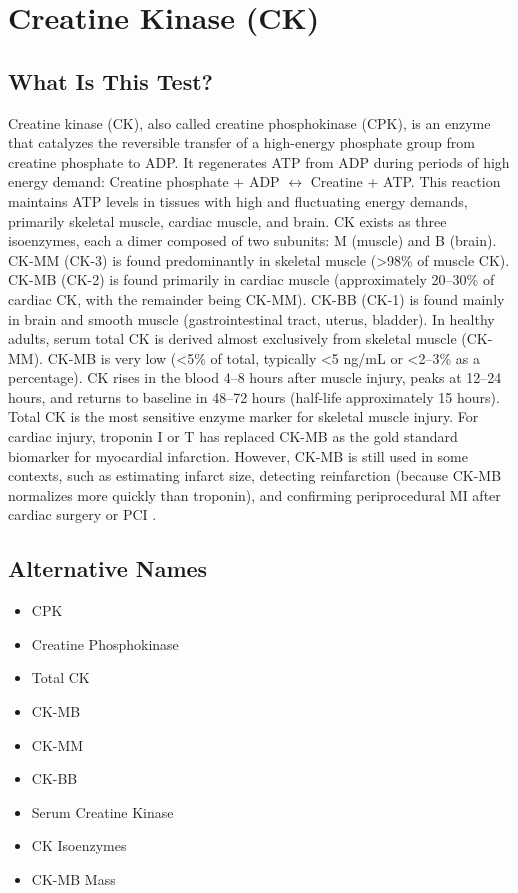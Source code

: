 \chapter{Creatine Kinase (CK)}

\section*{What Is This Test?}
Creatine kinase (CK), also called creatine phosphokinase (CPK), is an enzyme that catalyzes the reversible transfer of a high-energy phosphate group from creatine phosphate to ADP. It regenerates ATP from ADP during periods of high energy demand: Creatine phosphate + ADP $\leftrightarrow$ Creatine + ATP. This reaction maintains ATP levels in tissues with high and fluctuating energy demands, primarily skeletal muscle, cardiac muscle, and brain. CK exists as three isoenzymes, each a dimer composed of two subunits: M (muscle) and B (brain). CK-MM (CK-3) is found predominantly in skeletal muscle (>98\% of muscle CK). CK-MB (CK-2) is found primarily in cardiac muscle (approximately 20--30\% of cardiac CK, with the remainder being CK-MM). CK-BB (CK-1) is found mainly in brain and smooth muscle (gastrointestinal tract, uterus, bladder). In healthy adults, serum total CK is derived almost exclusively from skeletal muscle (CK-MM). CK-MB is very low (<5\% of total, typically <5 ng/mL or <2--3\% as a percentage). CK rises in the blood 4--8 hours after muscle injury, peaks at 12--24 hours, and returns to baseline in 48--72 hours (half-life approximately 15 hours). Total CK is the most sensitive enzyme marker for skeletal muscle injury. For cardiac injury, troponin I or T has replaced CK-MB as the gold standard biomarker for myocardial infarction. However, CK-MB is still used in some contexts, such as estimating infarct size, detecting reinfarction (because CK-MB normalizes more quickly than troponin), and confirming periprocedural MI after cardiac surgery or PCI \cite{panteghini2006recommendations}.

\section*{Alternative Names}
\begin{itemize}
  \item CPK
  \item Creatine Phosphokinase
  \item Total CK
  \item CK-MB
  \item CK-MM
  \item CK-BB
  \item Serum Creatine Kinase
  \item CK Isoenzymes
  \item CK-MB Mass
\end{itemize}
